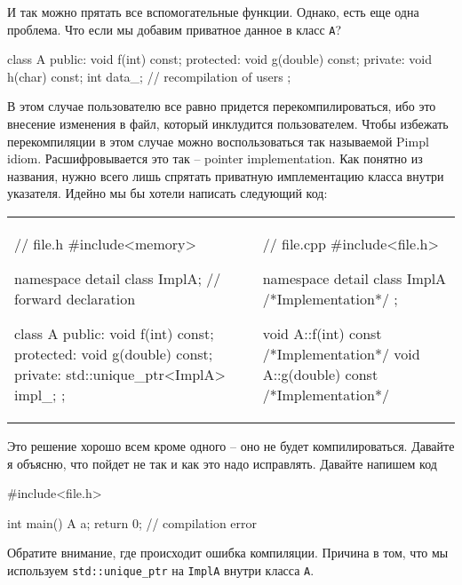 И так можно прятать все вспомогательные функции.
Однако, есть еще одна проблема.
Что если мы добавим приватное данное в класс \verb"A"?
\begin{cppcode}
class A {
public:
  void f(int) const;
protected:
  void g(double) const;
private:
  void h(char) const;
  int data_; // recompilation of users
};
\end{cppcode}
В этом случае пользователю все равно придется перекомпилироваться, ибо это внесение изменения в файл, который инклудится пользователем.
Чтобы избежать перекомпиляции в этом случае можно воспользоваться так называемой Pimpl idiom.
Расшифровывается это так -- pointer implementation.
Как понятно из названия, нужно всего лишь спрятать приватную имплементацию класса внутри указателя.
Идейно мы бы хотели написать следующий код:
\begin{center}
\begin{tabular}{ll}
{
\begin{minipage}[\baselineskip]{8cm}
\begin{cppcode}
// file.h
#include<memory>

namespace detail {
class ImplA; // forward declaration
}

class A {
public:
  void f(int) const;
protected:
  void g(double) const;
private:
  std::unique_ptr<ImplA> impl_;
};
\end{cppcode}
\end{minipage}
}&{
\begin{minipage}[\baselineskip]{8cm}
\begin{cppcode}[numbers = none]
// file.cpp
#include<file.h>

namespace detail {
class ImplA {
  /*Implementation*/
};
}

void A::f(int) const {
  /*Implementation*/
}
void A::g(double) const {
  /*Implementation*/
}
\end{cppcode}
\end{minipage}
}\\
\end{tabular}
\end{center}
Это решение хорошо всем кроме одного -- оно не будет компилироваться.
Давайте я объясню, что пойдет не так и как это надо исправлять.
Давайте напишем код
\begin{cppcode}
#include<file.h>

int main() {
  A a;
  return 0;
} // compilation error
\end{cppcode}
Обратите внимание, где происходит ошибка компиляции.
Причина в том, что мы используем \verb"std::unique_ptr" на \verb"ImplA"  внутри класса \verb"A".
